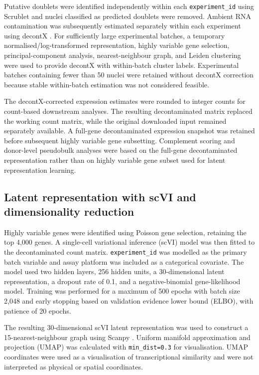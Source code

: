 \documentclass[10pt,letterpaper]{article}
\begin{document}
Putative doublets were identified independently within each \texttt{experiment\_id} using Scrublet \cite{Wolock_Lopez_Klein_2019} and nuclei classified as predicted doublets were removed. Ambient RNA contamination was subsequently estimated separately within each experiment using decontX \cite{Yang_Corbett_Koga_Wang_Johnson_Yajima_Campbell_2020}. For sufficiently large experimental batches, a temporary normalised/log-transformed representation, highly variable gene selection, principal-component analysis, nearest-neighbour graph, and Leiden clustering \cite{Traag_Waltman2019} were used to provide decontX with within-batch cluster labels. Experimental batches containing fewer than 50 nuclei were retained without decontX correction because stable within-batch estimation was not considered feasible.

The decontX-corrected expression estimates were rounded to integer counts for count-based downstream analyses. The resulting decontaminated matrix replaced the working count matrix, while the original downloaded input remained separately available. A full-gene decontaminated expression snapshot was retained before subsequent highly variable gene subsetting. Complement scoring and donor-level pseudobulk analyses were based on the full-gene decontaminated representation rather than on highly variable gene subset used for latent representation learning.

\subsection*{Latent representation with scVI and dimensionality reduction}

Highly variable genes were identified using Poisson gene selection, retaining the top 4,000 genes. A single-cell variational inference (scVI) model \cite{lopezDeepGenerativeModeling2018, gayosoPythonLibraryProbabilistic2022} was then fitted to the decontaminated count matrix. \texttt{experiment\_id} was modelled as the primary batch variable and assay platform was included as a categorical covariate. The model used two hidden layers, 256 hidden units, a 30-dimensional latent representation, a dropout rate of 0.1, and a negative-binomial gene-likelihood model. Training was performed for a maximum of 500 epochs with batch size 2,048 and early stopping based on validation evidence lower bound (ELBO), with patience of 20 epochs.

The resulting 30-dimensional scVI latent representation was used to construct a 15-nearest-neighbour graph using Scanpy \cite{wolfSCANPYLargescaleSinglecell2018a}. Uniform manifold approximation and projection (UMAP) \cite{mcinnesUMAPUniformManifold2020} was calculated with \texttt{min\_dist=0.3} for visualisation. UMAP coordinates were used as a visualisation of transcriptional similarity and were not interpreted as physical or spatial coordinates.
\end{document}
